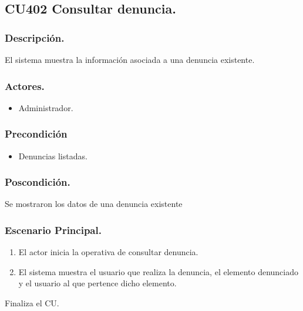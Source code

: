 \subsection{CU402 Consultar denuncia.}
\subsubsection{Descripci\'{o}n.}
El sistema muestra la informaci\'{o}n asociada a una denuncia existente.
\subsubsection{Actores.}
\begin{itemize}
\item Administrador.
\end{itemize}
\subsubsection{Precondici\'{o}n}
\begin{itemize}
\item Denuncias listadas.
\end{itemize}
\subsubsection{Poscondici\'{o}n.}
Se mostraron los datos de una denuncia existente
\subsubsection{Escenario Principal.}
\begin{enumerate}
\item El actor inicia la operativa de consultar denuncia.
\item El sistema muestra el usuario que realiza la denuncia, el elemento denunciado y el usuario al que pertence dicho elemento.
\end{enumerate}
Finaliza el CU.
